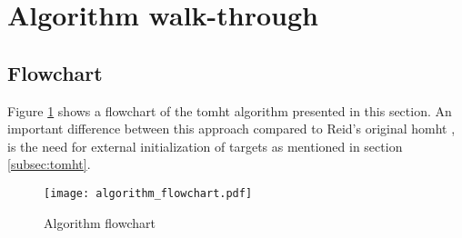 \section{Algorithm walk-through}
\label{sec:algorithm}
\subsection{Flowchart}
Figure \ref{fig:algorithm_flow} shows a flowchart of the \gls{tomht} algorithm presented in this section. An important difference between this approach compared to Reid's original \gls{homht} \cite{Reid1979}, is the need for external initialization of targets as mentioned in section \ref{subsec:tomht}.

\begin{figure}[H]
\centering
\texttt{[image: algorithm\_flowchart.pdf]}
\caption{Algorithm flowchart}
\label{fig:algorithm_flow}
\end{figure}

